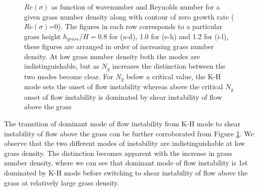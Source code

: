\documentclass[aps,prl,twocolumn,showpacs,superscriptaddress,groupedaddress,10pt]{revtex4-1}  %
\begin{document}
\begin{figure}

\caption{$Re(\sigma)$ as function of wavenumber and Reynolds number for a given grass number density along with contour of zero growth rate ($Re(\sigma)$=0). The figures in each 
row corresponds to a particular grass height $h_{grass}/H = 0.8$ for (a-d), 1.0 for (e-h) and  1.2 for (i-l), these figures are arranged in order of increasing grass 
number density. At low grass number density both the modes are indistinguishable, but as $N_g$ increases the distinction between the two modes become clear. For $N_g$ below
a critical value, the K-H mode sets the onset of flow instability whereas above the critical $N_{g}$ onset of flow instability is dominated by shear instability of flow above the grass}
\label{K_Re_sigma_set3}
\end{figure}
\newline 
The transition of dominant mode of flow instability from K-H mode to shear instability of flow above the grass can be further corroborated from Figure \ref{K_Re_sigma_set3}.
We observe that the two different modes of instability are indistinguishable at low grass density. The distinction becomes apparent with the increase in grass number density, where we 
can see that dominant mode of flow instability is 1st dominated by K-H mode before switching to shear instability of flow above the grass at relatively large grass density.  
\end{document}
